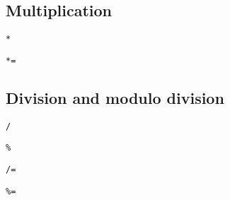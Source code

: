 
\subsection{Multiplication}

\begin{verbatim}
*
\end{verbatim}

\begin{verbatim}
*=
\end{verbatim}

\subsection{Division and modulo division}

\begin{verbatim}
/
\end{verbatim}

\begin{verbatim}
%
\end{verbatim}

\begin{verbatim}
/=
\end{verbatim}

\begin{verbatim}
%=
\end{verbatim}

